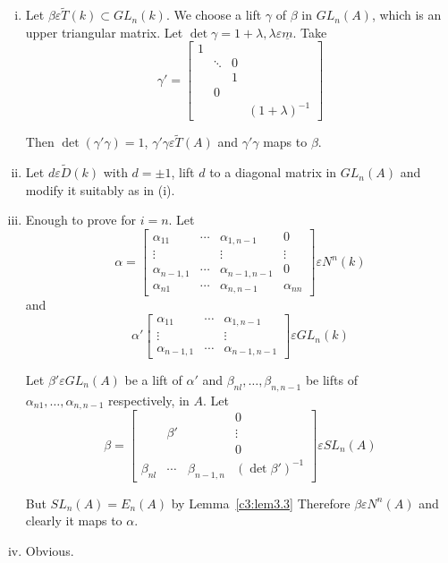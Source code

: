 \begin{Proof}
\begin{enumerate}[(i)]
\item Let $\beta \varepsilon \tilde{T}(k)\subset GL_n(k)$. We choose a
lift $\gamma$ of $\beta$ in $GL_n(A)$, which is an upper triangular
matrix. Let $\det \gamma=1+\lambda,\lambda \varepsilon
\underline{m}$. Take 
$$
\gamma'=
\begin{bmatrix}
1 & & &\\
& \ddots &0 &\\
&& 1 &\\
& 0 &  &\\
& & & (1+\lambda)^{-1}
\end{bmatrix}
$$

Then $\det(\gamma' \gamma)=1$, $\gamma'\gamma \varepsilon
\tilde{T}(A)$ and $\gamma'\gamma$ maps to $\beta$.

\item Let $d\varepsilon \tilde{D}(k)$ with $d=\pm 1$, lift $d$ to a
  diagonal matrix in $GL_n(A)$ and modify it  suitably as in (i).
\item Enough to prove for $i=n$. Let 
$$
\alpha=
\begin{bmatrix}
\alpha_{11}& \cdots & \alpha_{1,n-1} &0\\
\vdots & & \vdots & \vdots\\
\alpha_{n-1,1}& \cdots & \alpha_{n-1,n-1} & 0\\
\alpha_{n1} & \cdots & \alpha_{n,n-1} & \alpha_{nn}
\end{bmatrix} \varepsilon N^{n}(k)
$$
and 
$$
\alpha'
\begin{bmatrix}
\alpha_{11} & \cdots & \alpha_{1,n-1}\\
\vdots & &\vdots\\
\alpha_{n-1,1} & \cdots & \alpha_{n-1,n-1}
\end{bmatrix} \varepsilon GL_n(k)
$$

Let $\beta' \varepsilon GL_n(A)$ be a lift of $\alpha'$ and
$\beta_{nl},\ldots,\beta_{n,n-1}$ be lifts of\\
$\alpha_{n1},\ldots,\alpha_{n,n-1}$ respectively, in $A$. Let 
$$
\beta=
\begin{bmatrix}
&& &0\\
& \beta' & & \vdots\\
& & & 0\\
\beta_{nl} & \cdots & \beta_{n-1,n} & (\det \beta')^{-1}
\end{bmatrix} \varepsilon SL_n(A)
$$

But $SL_n(A)=E_n(A)$ by Lemma~\ref{c3:lem3.3} Therefore $\beta
\varepsilon N^{n}(A)$ and clearly it maps to $\alpha$.

\item Obvious.
\end{enumerate}
\enprf
\end{Proof}

